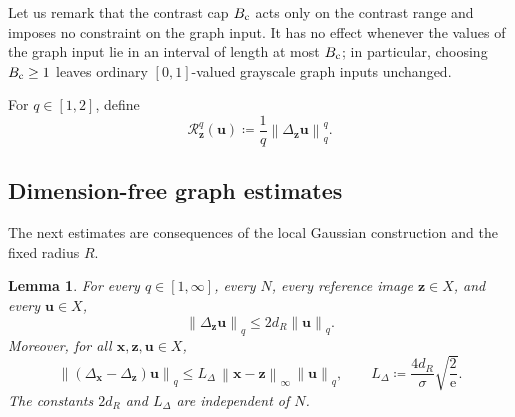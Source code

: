 \documentclass{article}
\newtheorem{lemma}[theorem]{Lemma}
\theoremstyle{remark}
\newcommand{\norm}[1]{\left\lVert #1 \right\rVert}
\newcommand{\Rreg}{\mathcal{R}}
\newcommand{\bx}{{\bm{x}}}
\newcommand{\bz}{{\bm{z}}}
\newcommand{\bu}{{\bm{u}}}
\begin{document}
Let us remark that the contrast cap $B_{\rm c}$ acts only on the contrast range and imposes no
constraint on the graph input. It has no effect whenever
 the values of the graph input lie in an interval of length at most
$B_{\rm c}$; in particular, choosing $B_{\rm c}\ge1$ leaves ordinary
$[0,1]$-valued grayscale graph inputs unchanged. 

For $q\in[1,2]$, define
\begin{equation}\label{def:graph-regularizer}
\Rreg_\bz^q(\bu)\coloneqq\frac1q\norm{\Delta_\bz \bu}_q^q .
\end{equation}


\subsection{Dimension-free graph estimates}\label{ssec:graph-estimates}

The next estimates are consequences of the local Gaussian construction and the fixed radius $R$. 

\begin{lemma}\label{lem:graph-bounds}
For every $q\in[1,\infty]$, every $N$, every reference image $\bz\in X$, and every $\bu\in X$,
\begin{equation}\label{eq:Delta-uniform-bound}
\norm{\Delta_\bz \bu}_q\le 2d_R\norm{\bu}_q.
\end{equation}
Moreover, for all $\bx,\bz,\bu\in X$,
\begin{equation}\label{eq:Delta-Lipschitz}
\norm{(\Delta_\bx-\Delta_\bz)\bu}_q
\le L_\Delta\,\norm{\bx-\bz}_\infty\,\norm{\bu}_q,
\qquad
L_\Delta\coloneqq\frac{4d_R}{\sigma}\sqrt{\frac{2}{\mathrm{e}}} .
\end{equation}
The constants $2d_R$ and $L_\Delta$ are independent of $N$.
\end{lemma}
\end{document}
